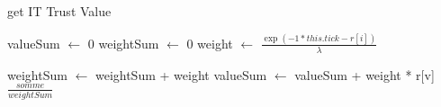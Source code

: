 
\begin{algorithm}[H]
\caption{get IT Trust Value}
\begin{algorithmic} 
\STATE valueSum $\leftarrow$ 0
\STATE weightSum $\leftarrow$ 0
\STATE weight $\leftarrow$ $\frac{\exp{ (-1*this.tick-r[i]) }}{\lambda}$

\STATE weightSum $\leftarrow$ weightSum + weight
\STATE valueSum $\leftarrow$ valueSum + weight * r[v]
\ENDFOR
\RETURN $\frac{somme}{weightSum}$
\end{algorithmic}
\end{algorithm}